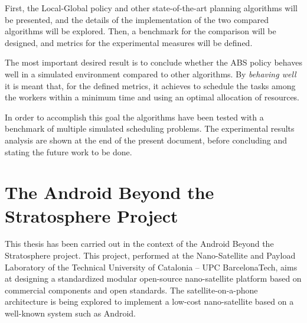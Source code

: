 First, the Local-Global policy and other state-of-the-art planning algorithms will be presented, and the details of the implementation of the two compared algorithms will be explored. Then, a benchmark for the comparison will be designed, and metrics for the experimental measures will be defined.


The most important desired result is to conclude whether the ABS policy behaves well in a simulated environment compared to other algorithms. By \emph{behaving well} it is meant that, for the defined metrics, it achieves to schedule the tasks among the workers within a minimum time and using an optimal allocation of resources.

In order to accomplish this goal the algorithms have been tested with a benchmark of multiple simulated scheduling problems. The experimental results analysis are shown at the end of the present document, before concluding and stating the future work to be done.

\section{The Android Beyond the Stratosphere Project}

This thesis has been carried out in the context of the Android Beyond the Stratosphere project. This project, performed at the Nano-Satellite and Payload Laboratory of the Technical University of Catalonia -- UPC BarcelonaTech, aims at designing a standardized modular open-source nano-satellite platform based on commercial components and open standards. The satellite-on-a-phone architecture is being explored to implement a low-cost nano-satellite based on a well-known system such as Android.

